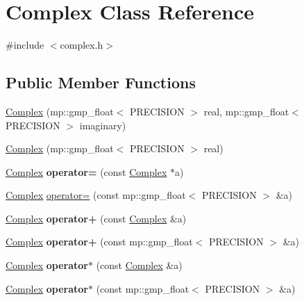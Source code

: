 \hypertarget{classComplex}{}\section{Complex Class Reference}
\label{classComplex}


{\ttfamily \#include $<$complex.\+h$>$}

\subsection*{Public Member Functions}
\begin{DoxyCompactItemize}
\item 
\hyperlink{classComplex_a54f4fbd1ac90611ecfc46fdc289ad242}{Complex} (mp\+::gmp\+\_\+float$<$ P\+R\+E\+C\+I\+S\+I\+ON $>$ real, mp\+::gmp\+\_\+float$<$ P\+R\+E\+C\+I\+S\+I\+ON $>$ imaginary)
\item 
\hyperlink{classComplex_a6e691b34104a04d12355a0fabe8b033e}{Complex} (mp\+::gmp\+\_\+float$<$ P\+R\+E\+C\+I\+S\+I\+ON $>$ real)
\item 
\hyperlink{classComplex}{Complex} {\bfseries operator=} (const \hyperlink{classComplex}{Complex} $\ast$a)\hypertarget{classComplex_a33e6c03300c78d4cb1ffb1e3175b6a94}{}\label{classComplex_a33e6c03300c78d4cb1ffb1e3175b6a94}

\item 
\hyperlink{classComplex}{Complex} \hyperlink{classComplex_a39c4d98c221e723e244559d37f910d7e}{operator=} (const mp\+::gmp\+\_\+float$<$ P\+R\+E\+C\+I\+S\+I\+ON $>$ \&a)
\item 
\hyperlink{classComplex}{Complex} {\bfseries operator+} (const \hyperlink{classComplex}{Complex} \&a)\hypertarget{classComplex_aec03dbe29aa705a82935c23fb4395bfc}{}\label{classComplex_aec03dbe29aa705a82935c23fb4395bfc}

\item 
\hyperlink{classComplex}{Complex} {\bfseries operator+} (const mp\+::gmp\+\_\+float$<$ P\+R\+E\+C\+I\+S\+I\+ON $>$ \&a)\hypertarget{classComplex_a157638a05e4a3a5da654c9cc08bd0afd}{}\label{classComplex_a157638a05e4a3a5da654c9cc08bd0afd}

\item 
\hyperlink{classComplex}{Complex} {\bfseries operator$\ast$} (const \hyperlink{classComplex}{Complex} \&a)\hypertarget{classComplex_a55025502ddf5d18e57a4e2d647918c51}{}\label{classComplex_a55025502ddf5d18e57a4e2d647918c51}

\item 
\hyperlink{classComplex}{Complex} {\bfseries operator$\ast$} (const mp\+::gmp\+\_\+float$<$ P\+R\+E\+C\+I\+S\+I\+ON $>$ \&a)\hypertarget{classComplex_a50555070c2fcde9bfc23d329be6018c5}{}\label{classComplex_a50555070c2fcde9bfc23d329be6018c5}

\end{DoxyCompactItemize}
